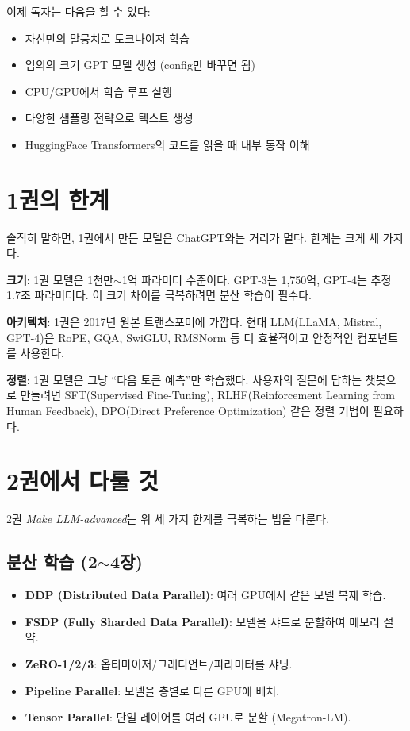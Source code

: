 이제 독자는 다음을 할 수 있다:
\begin{itemize}
  \item 자신만의 말뭉치로 토크나이저 학습
  \item 임의의 크기 GPT 모델 생성 (config만 바꾸면 됨)
  \item CPU/GPU에서 학습 루프 실행
  \item 다양한 샘플링 전략으로 텍스트 생성
  \item HuggingFace Transformers의 코드를 읽을 때 내부 동작 이해
\end{itemize}

\section{1권의 한계}

솔직히 말하면, 1권에서 만든 모델은 ChatGPT와는 거리가 멀다. 한계는 크게 세 가지다.

\textbf{크기}: 1권 모델은 1천만$\sim$1억 파라미터 수준이다. GPT-3는 1,750억, GPT-4는 추정 1.7조 파라미터다. 이 크기 차이를 극복하려면 분산 학습이 필수다.

\textbf{아키텍처}: 1권은 2017년 원본 트랜스포머에 가깝다. 현대 LLM(LLaMA, Mistral, GPT-4)은 RoPE, GQA, SwiGLU, RMSNorm 등 더 효율적이고 안정적인 컴포넌트를 사용한다.

\textbf{정렬}: 1권 모델은 그냥 ``다음 토큰 예측''만 학습했다. 사용자의 질문에 답하는 챗봇으로 만들려면 SFT(Supervised Fine-Tuning), RLHF(Reinforcement Learning from Human Feedback), DPO(Direct Preference Optimization) 같은 정렬 기법이 필요하다.

\section{2권에서 다룰 것}

2권 \textit{Make LLM-advanced}는 위 세 가지 한계를 극복하는 법을 다룬다.

\subsection{분산 학습 (2$\sim$4장)}

\begin{itemize}
  \item \textbf{DDP (Distributed Data Parallel)}: 여러 GPU에서 같은 모델 복제 학습.
  \item \textbf{FSDP (Fully Sharded Data Parallel)}: 모델을 샤드로 분할하여 메모리 절약.
  \item \textbf{ZeRO-1/2/3}: 옵티마이저/그래디언트/파라미터를 샤딩.
  \item \textbf{Pipeline Parallel}: 모델을 층별로 다른 GPU에 배치.
  \item \textbf{Tensor Parallel}: 단일 레이어를 여러 GPU로 분할 (Megatron-LM).
\end{itemize}


